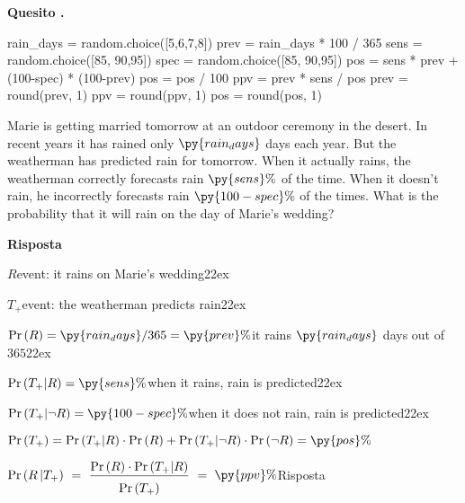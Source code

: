 \documentclass[11pt,twoside,a4paper]{article}
\def\Pr{{\rm Pr\,}}
\newcounter{quesito}
\newenvironment{question}{\bigskip\addtocounter{quesito}{1}\par\textbf{Quesito \thequesito.}}{\vspace{\parskip}}
\newenvironment{answer}{\par\textbf{Risposta\quad}}{\vspace{\parskip}}
\begin{document}
\begin{question}
\def\Pr{{\rm Pr\,}}
\begin{pycode}
rain_days = random.choice([5,6,7,8])
prev = rain_days * 100 / 365
sens =  random.choice([85, 90,95])
spec = random.choice([85, 90,95])
pos =  sens * prev + (100-spec) * (100-prev)
pos = pos / 100
ppv =  prev * sens  / pos
prev = round(prev, 1)
ppv = round(ppv, 1)
pos = round(pos, 1)
\end{pycode}
Marie is getting married tomorrow at an outdoor ceremony in the desert. In recent years it has rained only $\py{rain_days}$ days each year. But the weatherman has predicted rain for tomorrow. When it actually rains, the weatherman correctly forecasts rain $\py{sens}\%$ of the time. When it doesn’t rain, he incorrectly forecasts rain $\py{100-spec}\%$ of the times. What is the probability that it will rain on the day of Marie’s wedding?

\begin{answer}

$R$\hfill event: it rains on Marie’s wedding\kern22ex

$T_+$\hfill event: the weatherman predicts rain\kern22ex

$\Pr(R) =\py{rain_days}/365 = \py{prev}\%$\hfill it rains $\py{rain_days}$ days out of $365$\kern22ex

$\Pr(T_+|R) = \py{sens}\%$\hfill when it rains, rain is predicted\kern22ex

$\Pr(T_+|\neg R) = \py{100-spec}\%$\hfill when it does not rain,  rain is predicted\kern22ex

$\Pr(T_+) = \Pr(T_+|R)\cdot \Pr(R)+ \Pr(T_+|\neg R)\cdot \Pr(\neg R) = \py{pos}\%$ 

$\displaystyle \Pr(R\,| T_+)\ =\ \frac{\Pr(R)\cdot \Pr(T_+|R)}{\Pr(T_+)\vphantom{\Big[}}\ =\kern1ex${\color{blue}$\py{ppv}\%$\hfill Risposta}

\end{answer}
\end{question}
\end{document}
